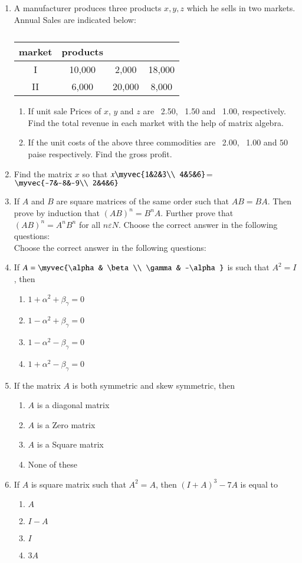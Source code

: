 \documentclass{article}
\theoremstyle{remark}
\begin{document}
\begin{enumerate}
\item A manufacturer produces three products $x, y, z$ which he sells in two markets. Annual Sales are indicated below:
\begin{table}
\centering
\begin{tabular}{|c|c|c|c|}
\hline
market & products\\
\hline
I &10,000 &2,000 &18,000\\
\hline
II &6,000 &20,000 &8,000\\
\hline
\end{tabular}
\caption{}
\end{table}
\begin{enumerate}
\item If unit sale Prices of $x$, $y$ and $z$ are \rupee~2.50, \rupee~1.50 and \rupee~1.00, respectively. Find the total revenue in each market with the help of matrix algebra.
\item If the unit costs of the above three commodities are \rupee~2.00, \rupee~1.00 and $50$ paise respectively. Find the gross profit.
\end{enumerate}
\item Find the matrix $x$ so that $x\myvec{1&2&3\\ 4&5&6}$= $\myvec{-7&-8&-9\\ 2&4&6}$
\item If $A$ and $B$ are square matrices of the same order such that $AB=BA$. Then prove by induction that $(AB)^n=B^nA$. Further prove that $(AB)^n=A^nB^n$ for all $n \varepsilon N$. Choose the correct answer in the following questions:
\\ Choose the correct answer in the following questions:
\item If $A=\myvec{\alpha& \beta \\ \gamma& -\alpha}$ is such that $A^2= I$, then
\begin{enumerate} 
\item $1+ \alpha^2+ \beta_\gamma=0$
\item $1-\alpha^2+ \beta_\gamma=0$
\item $1-\alpha^2-\beta_\gamma=0$
\item $1+\alpha^2- \beta_\gamma=0$ 
\end{enumerate}
\item If the matrix $A$ is both symmetric and skew symmetric, then
\begin{enumerate}
\item $A$ is a diagonal matrix
\item $A$ is a Zero matrix
\item $A$ is a Square matrix
\item None of these
\end{enumerate}
\item If $A$ is square matrix such that $A^2=A$, then $(I+A)^3-7A$ is equal to
\begin{enumerate}
\item $A$
\item $I-A$
\item $I$
\item $3A$
\end{enumerate}
\end{enumerate}
\end{document}
